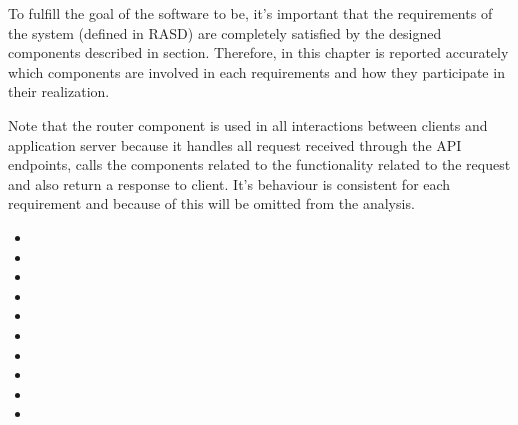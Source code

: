 To fulfill the goal of the software to be, it's important that the requirements of the system (defined in RASD) are completely satisfied by the designed components described in \hyperref[sec:components]{\color{blue}{component view}} section. Therefore, in this chapter is reported accurately which components are involved in each requirements and how they participate in their realization.

Note that the router component is used in all interactions between clients and application server because it handles all request received through the API endpoints, calls the components related to the functionality related to the request and also return a response to client. It's behaviour is consistent for each requirement and because of this will be omitted from the analysis.

\begin{itemize}[label={}]
	\item {}
	\item {}
	\item {}
	\item {}
	\item {}
	\item {}
	\item {}
	\item {}
	\item {}
	\item {}	
\end{itemize}

